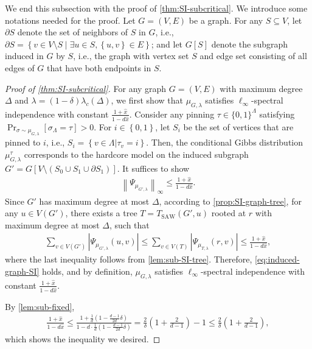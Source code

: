 \documentclass[11pt]{article}
\theoremstyle{plain}
\theoremstyle{definition}
\theoremstyle{remark}
\newcommand{\norm}[1]{\left\lVert #1 \right\rVert}
\newcommand{\set}[1]{\left\{#1\right\}}
\newcommand{\tuple}[1]{\left(#1\right)}
\newcommand{\tp}{\tuple}
\def\oPr{\mathop{\mathrm{Pr}}}
\renewcommand{\Pr}[2][]{
  \oPr_{#1}\left[#2\right] } %
\begin{document}
We end this subsection with the proof of \cref{thm:SI-subcritical}.
We introduce some notations needed for the proof.
Let $G=(V,E)$ be a graph.
For any $S \subseteq V$, let $\partial S$ denote the set of neighbors of $S$ in $G$, i.e., $\partial S = \set{ v \in V \setminus S \mid \exists u \in S, \set{u, v} \in E }$; and let $G[S]$ denote the subgraph induced in $G$ by $S$, i.e., the graph with vertex set $S$ and edge set consisting of all edges of $G$ that have both endpoints in $S$.

\begin{proof}[Proof of \cref{thm:SI-subcritical}]
    For any graph $G=(V,E)$ with maximum degree $\Delta$ and $\lambda=(1-\delta) \lambda_c(\Delta)$, we first show that $\mu_{G,\lambda}$ satisfies $\ell_\infty$-spectral independence with constant $\frac{1+\hat{x}}{1-d\hat{x}}$.
	Consider any pinning $\tau \in \{0,1\}^\Lambda$ satisfying $\Pr[\sigma\sim\mu_{G,\lambda}]{\sigma_\Lambda = \tau}>0$. For $i\in\set{0,1}$, let $S_i$ be the set of vertices that are pinned to $i$, i.e., $S_i=\set{v\in \Lambda\vert \tau_v=i}$.
    Then, the conditional Gibbs distribution $\mu_{G,\lambda}^{\tau}$ corresponds to the hardcore model on the induced subgraph $G'=G[V\setminus (S_0\cup S_1\cup\partial S_1)]$.
    It suffices to show
    \begin{align}\label{eq:induced-graph-SI}
\norm{\Psi_{\mu_{G',\lambda}}}_\infty\leq \frac{1+\hat{x}}{1-d\hat{x}}.
    \end{align}
    Since $G'$ has maximum degree at most $\Delta$, according to \cref{prop:SI-graph-tree}, for any $u\in V(G')$, there exists a tree $T = T_{\mathrm{SAW}}(G',u)$ rooted at $r$ with maximum degree at most $\Delta$, such that 
	\begin{align*}
		\sum_{v \in V(G')} \left| \Psi_{\mu_{G',\lambda}}(u,v) \right|
		\le \sum_{v \in V(T)} \left| \Psi_{\mu_{T,\lambda}}(r,v) \right| \leq \frac{1+\hat{x}}{1-d\hat{x}},
	\end{align*}
    where the last inequality follows from \cref{lem:sub-SI-tree}.
    Therefore, \cref{eq:induced-graph-SI} holds, and by definition, $\mu_{G,\lambda}$ satisfies $\ell_\infty$-spectral independence with constant $\frac{1+\hat{x}}{1-d\hat{x}}$.
    
    By \cref{lem:sub-fixed},
    \begin{align*}
        \frac{1+\hat{x}}{1-d\hat{x}}\leq \frac{1+\frac{1}{d}\tp{1-\frac{d-1}{2d}\delta}}{1-d\cdot\frac{1}{d}\tp{1-\frac{d-1}{2d}\delta}}
        =\frac{2}{\delta} \left(1+\frac{2}{d-1}\right)-1
        \leq \frac{2}{\delta} \left(1+\frac{2}{d-1}\right),
    \end{align*}
    which shows the inequality we desired.
\end{proof}
\end{document}
